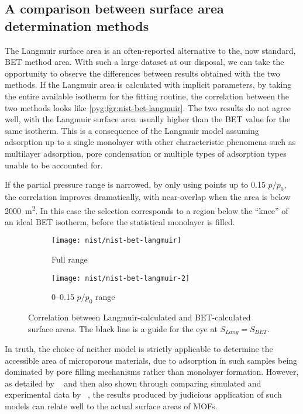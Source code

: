 \subsection{A comparison between surface area determination methods}

The Langmuir surface area is an often-reported alternative 
to the, now standard, BET method area.
With such a large dataset at our disposal, we can take
the opportunity to observe the differences between results
obtained with the two methods.
If the Langmuir area is calculated with implicit parameters,
by taking the entire available isotherm for the fitting
routine, the correlation between the two methods looks
like \autoref{pyg:fgr:nist-bet-langmuir}. The two results
do not agree well, with the Langmuir surface 
area usually higher than the BET value for the 
same isotherm. This is a consequence of the Langmuir model
assuming adsorption up to a single monolayer with other
characteristic phenomena such as multilayer adsorption,
pore condensation or multiple types of adsorption types
unable to be accounted for.

If the partial pressure range is narrowed, by only using 
points up to 0.15 \(p/p_0\), the correlation improves 
dramatically, with near-overlap when the area is below 
\SI{2000}{\metre^2}. In this case the selection corresponds
to a region below the ``knee'' of an ideal BET isotherm,
before the statistical monolayer is filled.

\begin{figure}[htb]
    \centering

    \begin{subfigure}{0.42\linewidth}
        \texttt{[image: nist/nist-bet-langmuir]}
        \caption{Full range}%
        \label{pyg:fgr:nist-bet-langmuir}
    \end{subfigure}%
    \begin{subfigure}{0.5\linewidth}
        \texttt{[image: nist/nist-bet-langmuir-2]}
        \caption{0--0.15 \(p/p_0\) range}%
        \label{pyg:fgr:nist-bet-langmuir-adj}
    \end{subfigure}%

    \caption{Correlation between Langmuir-calculated and 
    BET-calculated surface areas. The black line is a guide
    for the eye at \(S_{Lang} = S_{BET}\).}%
    \label{pyg:fgr:nist-area-cmp}
\end{figure}

In truth, the choice of neither model is strictly 
applicable to determine the accessible area of microporous
materials, due to adsorption in such samples being dominated
by pore filling mechanisms rather than monolayer formation.
However, as detailed by 
\citeauthor{rouquerolBetEquationApplicable2007}~\cite{rouquerolBetEquationApplicable2007}
and then also shown through comparing simulated and 
experimental data by
\citeauthor{waltonApplicabilityBETMethod2007}~\cite{waltonApplicabilityBETMethod2007}, the results
produced by judicious application of such models can relate
well to the actual surface areas of MOFs.

